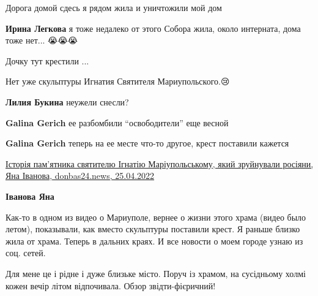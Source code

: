 
 
 
 
 

\qqSecCmt


Дорога домой сдесь я рядом жила и уничтожили мой дом

\textbf{Ирина Легкова} я тоже недалеко от этого Собора жила, около интерната, дома тоже нет... 😭😭😭


Дочку тут крестили ...


Нет уже скульптуры Игнатия Святителя Мариупольского.😢

\begin{itemize} %
\textbf{Лилия Букина} неужели снесли?

\textbf{Galina Gerich} ее разбомбили \enquote{освободители} еще весной

\textbf{Galina Gerich} теперь на ее месте что-то другое, крест поставили кажется

\href{https://donbas24.news/news/istoriya-pamyatnika-svyatitelyu-ignatiyu-mariupolskomu-yakii-zruinuvali-rosiyani}{%
Історія пам'ятника святителю Ігнатію Маріупольському, який зруйнували росіяни, Яна Іванова, donbas24.news, 25.04.2022%
}


\textbf{Іванова Яна} 

Как-то в одном из видео о Мариуполе, вернее о жизни этого храма (видео было
летом), показывали, как вместо скульптуры поставили крест. Я раньше близко жила
от храма. Теперь в дальних краях. И все новости о моем городе узнаю из соц.
сетей.

\end{itemize} %


Для мене це і рідне і дуже близьке місто. Поруч із храмом, на сусідньому холмі
кожен вечір літом відпочивала. Обзор звідти-фієричний!

